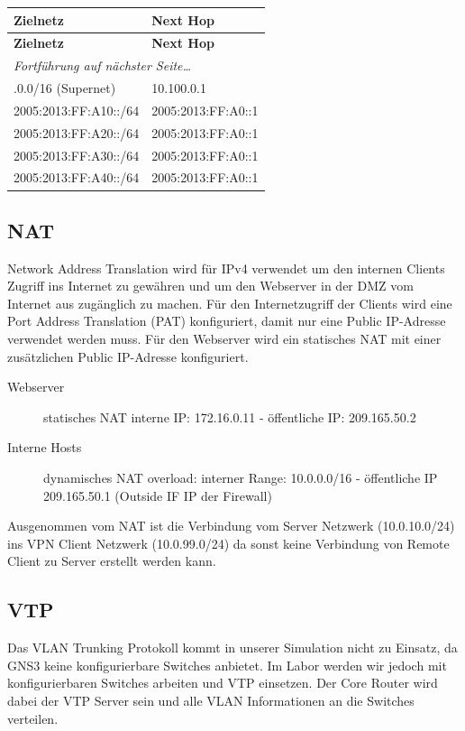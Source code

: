 \documentclass[11pt,a4paper,parskip=half]{scrartcl}
\begin{document}
\begin{longtable}{p{4.5cm}|p{4cm}}
	\textbf{Zielnetz} & \textbf{Next Hop}\\
	\hline
	\endfirsthead
	\textbf{Zielnetz} & \textbf{Next Hop}\\
	\hline
	\endhead
	\hline
	\multicolumn{2}{l}{\textit{Fortführung auf nächster Seite\ldots}} \\
	\endfoot
	\endlastfoot
	10.0.0.0/16 (Supernet) & 10.100.0.1\\
	2005:2013:FF:A10::/64 & 2005:2013:FF:A0::1\\
	2005:2013:FF:A20::/64 & 2005:2013:FF:A0::1\\
	2005:2013:FF:A30::/64 & 2005:2013:FF:A0::1\\
	2005:2013:FF:A40::/64 & 2005:2013:FF:A0::1
\end{longtable}

\subsection{NAT}
Network Address Translation wird für IPv4 verwendet um den internen Clients Zugriff ins Internet zu gewähren und um den Webserver in der DMZ vom Internet aus zugänglich zu machen. Für den Internetzugriff der Clients wird eine Port Address Translation (PAT) konfiguriert, damit nur eine Public IP-Adresse verwendet werden muss. Für den Webserver wird ein statisches NAT mit einer zusätzlichen Public IP-Adresse konfiguriert.

\begin{description}
	\item[Webserver] statisches NAT interne IP: 172.16.0.11 - öffentliche IP: 209.165.50.2
	\item[Interne Hosts] dynamisches NAT overload: interner Range: 10.0.0.0/16 - öffentliche IP 209.165.50.1 (Outside IF IP der Firewall)
\end{description}
Ausgenommen vom NAT ist die Verbindung vom Server Netzwerk (10.0.10.0/24) ins VPN Client Netzwerk (10.0.99.0/24) da sonst keine Verbindung von Remote Client zu Server erstellt werden kann.

\subsection{VTP}
Das VLAN Trunking Protokoll kommt in unserer Simulation nicht zu Einsatz, da GNS3 keine konfigurierbare Switches anbietet. Im Labor werden wir jedoch mit konfigurierbaren Switches arbeiten und VTP einsetzen. Der Core Router wird dabei der VTP Server sein und alle VLAN Informationen an die Switches verteilen.
\end{document}
